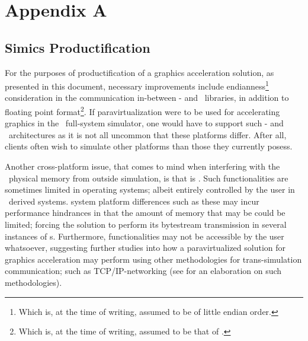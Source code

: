 
\chapter*{Appendix A}
\label{cha:appendixa}

\section*{Simics Productification}
\label{sec:appendixa_simicsproductification}
For the purposes of productification of a graphics acceleration solution, as presented in this document, necessary improvements include endianness\footnote{Which is, at the time of writing, assumed to be of little endian order.} consideration in the communication in-between \dvttermtarget - and \dvttermhost\ libraries, in addition to floating point format\footnote{Which is, at the time of writing, assumed to be that of \dvttermieeefp .}.
If paravirtualization were to be used for accelerating graphics in the \dvttermsimics\ full-system simulator, one would have to support such \dvttermtarget - and \dvttermhost\ architectures as it is not all uncommon that these platforms differ.
After all, clients often wish to simulate other platforms than those they currently posess.

Another cross-platform issue, that comes to mind when interfering with the \dvttermtarget\ physical memory from outside simulation, is that is .
Such functionalities are sometimes limited in operating systems; albeit entirely controlled by the user in \dvttermlinux\ derived systems.
 system platform differences such as these may incur performance hindrances in that the amount of memory that may be  could be limited; forcing the solution to perform its bytestream transmission in several instances of \dvttermmagicinstruction s.
Furthermore,  functionalities may not be accessible by the user whatsoever, suggesting further studies into how a paravirtualized solution for graphics acceleration may perform using other methodologies for trans-simulation communication; such as TCP/IP-networking (see  for an elaboration on such methodologies).

